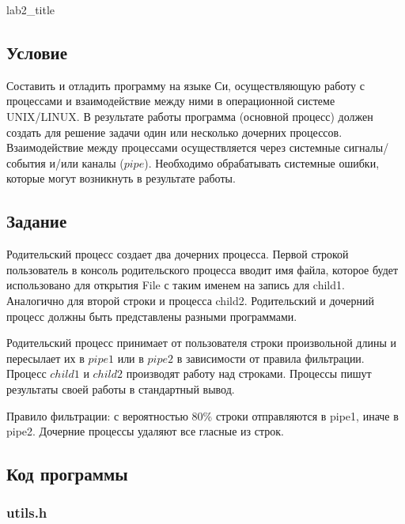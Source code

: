 \documentclass[12pt]{article}
\begin{document}
	
	{lab2_title}
	
	\subsection*{Условие}
	
	Составить и отладить программу на языке Си, осуществляющую работу с процессами и
	взаимодействие между ними в операционной системе UNIX/LINUX. В результате работы
	программа (основной процесс) должен создать для решение задачи один или несколько
	дочерних процессов. Взаимодействие между процессами осуществляется через системные
	сигналы/события и/или каналы ($pipe$).
	Необходимо обрабатывать системные ошибки, которые могут возникнуть в результате работы.
	
	\subsection*{Задание}
	
	Родительский процесс создает два дочерних процесса. Первой строкой пользователь в консоль
	родительского процесса вводит имя файла, которое будет использовано для открытия File с таким
	именем на запись для child1. Аналогично для второй строки и процесса child2. Родительский и
	дочерний процесс должны быть представлены разными программами.
	
	\par 
	
	Родительский процесс принимает от пользователя строки произвольной длины и пересылает их в
	$pipe1$ или в $pipe2$ в зависимости от правила фильтрации. Процесс $child1$ и $child2$ производят работу
	над строками. Процессы пишут результаты своей работы в стандартный вывод.
	
	\par 
	
	Правило фильтрации: с вероятностью 80\% строки отправляются в pipe1, иначе в pipe2.
	Дочерние процессы удаляют все гласные из строк.
	
	\subsection*{Код программы}
	
	\subsubsection*{utils.h}
	
	
	
\end{document}
